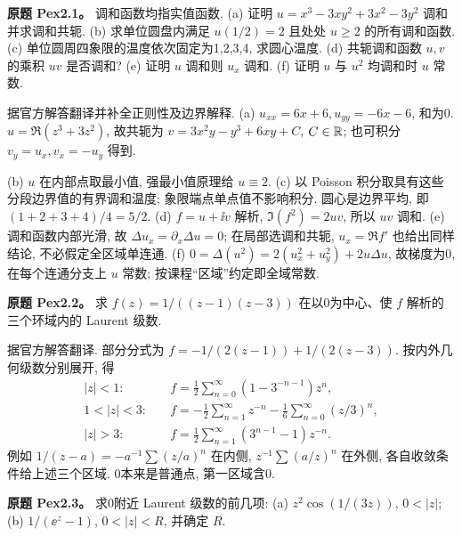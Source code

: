 \begin{exercise}\label{ass:pex2-1}
\textbf{原题 Pex2.1。} 调和函数均指实值函数. (a) 证明 $u=x^3-3xy^2+3x^2-3y^2$ 调和并求调和共轭. (b) 求单位圆盘内满足 $u(1/2)=2$ 且处处 $u\ge2$ 的所有调和函数. (c) 单位圆周四象限的温度依次固定为1,2,3,4, 求圆心温度. (d) 共轭调和函数 $u,v$ 的乘积 $uv$ 是否调和? (e) 证明 $u$ 调和则 $u_x$ 调和. (f) 证明 $u$ 与 $u^2$ 均调和时 $u$ 常数.
\end{exercise}
\begin{solution}
据官方解答翻译并补全正则性及边界解释. (a) $u_{xx}=6x+6,u_{yy}=-6x-6$, 和为0. $u=\Re(z^3+3z^2)$, 故共轭为 $v=3x^2y-y^3+6xy+C$, $C\in\mathbb R$; 也可积分 $v_y=u_x,v_x=-u_y$ 得到.

(b) $u$ 在内部点取最小值, 强最小值原理给 $u\equiv2$. (c) 以 Poisson 积分取具有这些分段边界值的有界调和温度; 象限端点单点值不影响积分. 圆心是边界平均, 即 $(1+2+3+4)/4=5/2$. (d) $f=u+\ii v$ 解析, $\Im(f^2)=2uv$, 所以 $uv$ 调和. (e) 调和函数内部光滑, 故 $\Delta u_x=\partial_x\Delta u=0$; 在局部选调和共轭, $u_x=\Re f'$ 也给出同样结论, 不必假定全区域单连通. (f) $0=\Delta(u^2)=2(u_x^2+u_y^2)+2u\Delta u$, 故梯度为0, 在每个连通分支上 $u$ 常数; 按课程“区域”约定即全域常数.
\end{solution}
\begin{exercise}\label{ass:pex2-2}
\textbf{原题 Pex2.2。} 求 $f(z)=1/((z-1)(z-3))$ 在以0为中心、使 $f$ 解析的三个环域内的 Laurent 级数.
\end{exercise}
\begin{solution}
据官方解答翻译. 部分分式为 $f=-1/(2(z-1))+1/(2(z-3))$. 按内外几何级数分别展开, 得
\[
\begin{aligned}
|z|<1:\quad&f=\frac12\sum_{n=0}^{\infty}(1-3^{-n-1})z^n,\\
1<|z|<3:\quad&f=-\frac12\sum_{n=1}^{\infty}z^{-n}-\frac16\sum_{n=0}^{\infty}(z/3)^n,\\
|z|>3:\quad&f=\frac12\sum_{n=1}^{\infty}(3^{n-1}-1)z^{-n}.
\end{aligned}
\]
例如 $1/(z-a)=-a^{-1}\sum(z/a)^n$ 在内侧, $z^{-1}\sum(a/z)^n$ 在外侧, 各自收敛条件给上述三个区域. 0本来是普通点, 第一区域含0.
\end{solution}
\begin{exercise}\label{ass:pex2-3}
\textbf{原题 Pex2.3。} 求0附近 Laurent 级数的前几项: (a) $z^2\cos(1/(3z))$, $0<|z|$; (b) $1/(\ee^z-1)$, $0<|z|<R$, 并确定 $R$.
\end{exercise}
